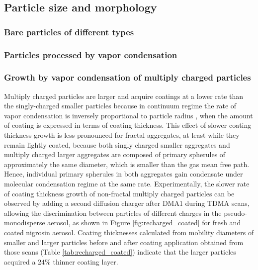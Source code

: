 \subsection{Particle size and morphology}

\subsubsection{Bare particles of different types}



\subsubsection{Particles processed by vapor condensation}



\subsubsection{Growth by vapor condensation of multiply charged particles}

Multiply charged particles are larger and acquire coatings at a lower rate than the singly-charged smaller particles because in continuum regime the rate of vapor condensation is inversely proportional to particle radius \citep{RN2}, when the amount of coating is expressed in terms of coating thickness. This effect of slower coating thickness growth is less pronounced for fractal aggregates, at least while they remain lightly coated, because both singly charged smaller aggregates and multiply charged larger aggregates are composed of primary spherules of approximately the same diameter, which is smaller than the gas mean free path. Hence, individual primary spherules in both aggregates gain condensate under molecular condensation regime at the same rate. Experimentally, the slower rate of coating thickness growth of non-fractal multiply charged particles can be observed by adding a second diffusion charger after DMA1 during TDMA scans, allowing the discrimination between particles of different charges in the pseudo-monodisperse aerosol, as shown in Figure \ref{fig:recharged_coated} for fresh and coated nigrosin aerosol. Coating thicknesses calculated from mobility diameters of smaller and larger particles before and after coating application obtained from those scans (Table \ref{tab:recharged_coated}) indicate that the larger particles acquired a $24\%$ thinner coating layer.



